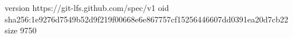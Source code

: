 version https://git-lfs.github.com/spec/v1
oid sha256:1e9276d7549b52d9f219f00668e6e867757cf15256446607dd0391ea20d7cb22
size 9750
